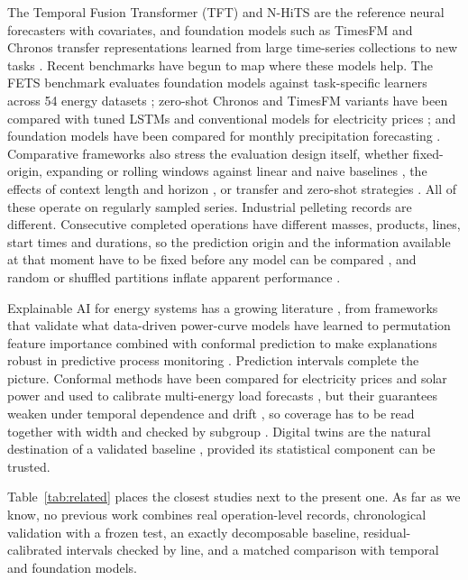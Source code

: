 The Temporal Fusion Transformer (TFT) \citep{lim2021} and N-HiTS \citep{challu2023} are the reference neural forecasters with covariates, and foundation models such as TimesFM and Chronos transfer representations learned from large time-series collections to new tasks \citep{das2024,ansari2024}. Recent benchmarks have begun to map where these models help. The FETS benchmark evaluates foundation models against task-specific learners across 54 energy datasets \citep{obermeier2026}; zero-shot Chronos and TimesFM variants have been compared with tuned LSTMs and conventional models for electricity prices \citep{miseta2026,lin2026}; and foundation models have been compared for monthly precipitation forecasting \citep{song2026tsfm}. Comparative frameworks also stress the evaluation design itself, whether fixed-origin, expanding or rolling windows against linear and naive baselines \citep{micallef2025}, the effects of context length and horizon \citep{kavoosighafi2026}, or transfer and zero-shot strategies \citep{neubauer2026}. All of these operate on regularly sampled series. Industrial pelleting records are different. Consecutive completed operations have different masses, products, lines, start times and durations, so the prediction origin and the information available at that moment have to be fixed before any model can be compared \citep{hewamalage2023}, and random or shuffled partitions inflate apparent performance \citep{tashman2000,cerqueira2020,bergmeir2018}.

Explainable AI for energy systems has a growing literature \citep{machlev2022,saarela2024,cacao2025}, from frameworks that validate what data-driven power-curve models have learned \citep{letzgus2024} to permutation feature importance combined with conformal prediction to make explanations robust in predictive process monitoring \citep{mehdiyev2025}. Prediction intervals complete the picture. Conformal methods have been compared for electricity prices and solar power \citep{oconnor2025,nam2025} and used to calibrate multi-energy load forecasts \citep{huang2026conformal}, but their guarantees weaken under temporal dependence and drift \citep{angelopoulos2021,barber2023,barber2021}, so coverage has to be read together with width and checked by subgroup \citep{gneitingcal2007,gneiting2007}. Digital twins are the natural destination of a validated baseline \citep{tao2019}, provided its statistical component can be trusted.

Table~\ref{tab:related} places the closest studies next to the present one. As far as we know, no previous work combines real operation-level records, chronological validation with a frozen test, an exactly decomposable baseline, residual-calibrated intervals checked by line, and a matched comparison with temporal and foundation models.

